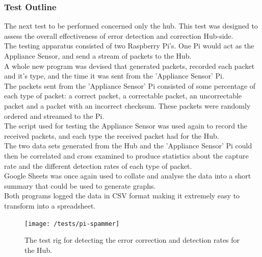 \documentclass[preprint,12pt,3p]{elsarticle}
\begin{document}
\subsubsection{Test Outline}
The next test to be performed concerned only the hub. This test was designed to assess the overall effectiveness of error detection and correction Hub-side.\\
The testing apparatus consisted of two Raspberry Pi's. One Pi would act as the Appliance Sensor, and send a stream of packets to the Hub.\\ 
A whole new program was devised that generated packets, recorded each packet and it's type, and the time it was sent from the 'Appliance Sensor' Pi.\\
The packets sent from the 'Appliance Sensor' Pi consisted of some percentage of each type of packet: a correct packet, a correctable packet, an uncorrectable packet and a packet with an incorrect checksum. These packets were randomly ordered and streamed to the Pi.\\
The script used for testing the Appliance Sensor was used again to record the received packets, and each type the received packet had for the Hub.\\
The two data sets generated from the Hub and the 'Appliance Sensor' Pi could then be correlated and cross examined to produce statistics about the capture rate and the different detection rates of each type of packet.\\
Google Sheets was once again used to collate and analyse the data into a short summary that could be used to generate graphs.\\
Both programs logged the data in CSV format making it extremely easy to transform into a spreadsheet.

\begin{figure}[H]
\centering
\texttt{[image: /tests/pi-spammer]}
\caption{The test rig for detecting the error correction and detection rates for the Hub.}
\label{fig:pi-spammer}
\end{figure}
\end{document}
